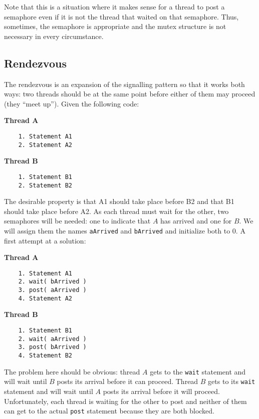 Note that this is a situation where it makes sense for a thread to post a semaphore even if it is not the thread that waited on that semaphore. Thus, sometimes, the semaphore is appropriate and the mutex structure is not necessary in every circumstance.
\newpage
\subsection*{Rendezvous}
The rendezvous is an expansion of the signalling pattern so that it works both ways: two threads should be at the same point before either of them may proceed (they ``meet up''). Given the following code:


\begin{multicols}{2}
	\textbf{Thread A}\vspace{-2em}
	\begin{verbatim}
	1. Statement A1
	2. Statement A2
  	\end{verbatim}
	\columnbreak
	\textbf{Thread B}\vspace{-2em}
	\begin{verbatim}
	1. Statement B1
	2. Statement B2
  \end{verbatim}
\end{multicols}
\vspace{-2em}

The desirable property is that A1 should take place before B2 and that B1 should take place before A2. As each thread must wait for the other, two semaphores will be needed: one to indicate that $A$ has arrived and one for $B$. We will assign them the names \texttt{aArrived} and \texttt{bArrived} and initialize both to 0. A first attempt at a solution:

\begin{multicols}{2}
	\textbf{Thread A}\vspace{-2em}
	\begin{verbatim}
	1. Statement A1
	2. wait( bArrived )
	3. post( aArrived )
	4. Statement A2
  \end{verbatim}
	\columnbreak
	\textbf{Thread B}\vspace{-2em}
	\begin{verbatim}
	1. Statement B1
	2. wait( aArrived )
	3. post( bArrived )
	4. Statement B2
  \end{verbatim}
\end{multicols}
\vspace{-2em}


The problem here should be obvious: thread $A$ gets to the \texttt{wait} statement and will wait until $B$ posts its arrival before it can proceed. Thread $B$ gets to its \texttt{wait} statement and will wait until $A$ posts its arrival before it will proceed. Unfortunately, each thread is waiting for the other to post and neither of them can get to the actual \texttt{post} statement because they are both blocked.

